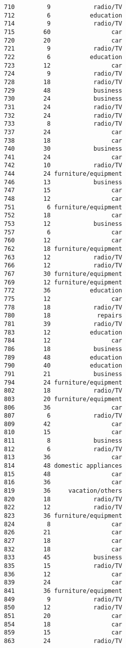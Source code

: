 \documentclass[
]{article}
\begin{document}
\begin{verbatim}
710         9            radio/TV
712         6           education
714         9            radio/TV
715        60                 car
720        20                 car
721         9            radio/TV
722         6           education
723        12                 car
724         9            radio/TV
728        18            radio/TV
729        48            business
730        24            business
731        24            radio/TV
732        24            radio/TV
733         8            radio/TV
737        24                 car
738        18                 car
740        30            business
741        24                 car
742        10            radio/TV
744        24 furniture/equipment
746        13            business
747        15                 car
748        12                 car
751         6 furniture/equipment
752        18                 car
753        12            business
757         6                 car
760        12                 car
762        18 furniture/equipment
763        12            radio/TV
766        12            radio/TV
767        30 furniture/equipment
769        12 furniture/equipment
772        36           education
775        12                 car
778        18            radio/TV
780        18             repairs
781        39            radio/TV
783        12           education
784        12                 car
786        18            business
789        48           education
790        40           education
791        21            business
794        24 furniture/equipment
802        18            radio/TV
803        20 furniture/equipment
806        36                 car
807         6            radio/TV
809        42                 car
810        15                 car
811         8            business
812         6            radio/TV
813        36                 car
814        48 domestic appliances
815        48                 car
816        36                 car
819        36     vacation/others
820        18            radio/TV
822        12            radio/TV
823        36 furniture/equipment
824         8                 car
826        21                 car
827        18                 car
832        18                 car
833        45            business
835        15            radio/TV
836        12                 car
839        24                 car
841        36 furniture/equipment
849         9            radio/TV
850        12            radio/TV
851        20                 car
854        18                 car
859        15                 car
863        24            radio/TV

\end{verbatim}
\end{document}
